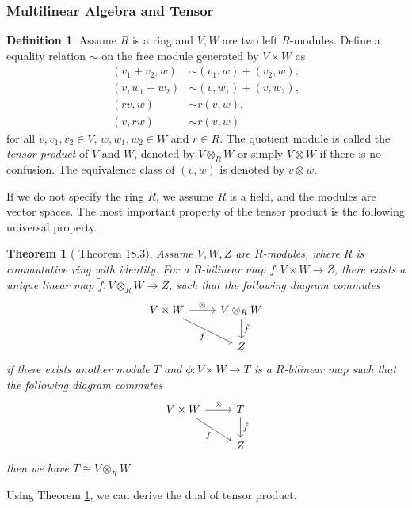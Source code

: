 \documentclass[12pt,a4paper,draft]{article}  %
\newcounter{cite}
\newtheorem{theorem}{Theorem}[section]
\theoremstyle{definition}
\newtheorem{definition}{Definition}[section]
\numberwithin{equation}{section}
\begin{document}
\subsubsection{Multilinear Algebra and Tensor}
\begin{definition}
        Assume $R$ is a ring and $V,W$ are two left $R$-modules. Define a equality relation $\sim$ on the free module generated by $V\times W$ as 
                \[
                \begin{aligned}
                (v_1 + v_2, w) &\sim (v_1,w) + (v_2,w), \\
                (v, w_1 + w_2) &\sim (v,w_1) + (v,w_2), \\
                (r v, w) &\sim r (v,w), \\
                (v, r w) &\sim r (v,w)
                \end{aligned}
                \]
        for all $v,v_1,v_2 \in V$, $w,w_1,w_2 \in W$ and $r \in R$. The quotient module is called the \emph{tensor product} of $V$ and $W$, denoted by $V \otimes_R W$ or simply $V \otimes W$ if there is no confusion. The equivalence class of $(v,w)$ is denoted by $v \otimes w$.
\end{definition}
If we do not specify the ring $R$, we assume $R$ is a field, and the modules are vector spaces. The most important property of the tensor product is the following universal property.
\begin{theorem}[\cite{Tu2017} Theorem 18.3]\label{universal_property_tensor_product}
        Assume $V,W,Z$ are $R$-modules, where $R$ is commutative ring with identity. For a $R$-bilinear map $f:V\times W \to Z$, there exists a unique linear map $\tilde{f}: V\otimes_R W \to Z$, such that the following diagram commutes
    \[
    \begin{tikzcd}
        V \times W \arrow{r}{\otimes} \arrow[swap]{rd}{f} & V \otimes_R W \arrow{d}{\tilde{f}} \\
         & Z
    \end{tikzcd}
    \]
    if there exists another module $T$ and $\phi: V \times W \to T$ is a $R$-bilinear map such that the following diagram commutes
    \[
    \begin{tikzcd}
        V \times W \arrow{r}{\otimes} \arrow[swap]{rd}{f} & T \arrow{d}{\tilde{f}} \\
         & Z
    \end{tikzcd}
    \]
    then we have $T \cong V \otimes_R W$.
\end{theorem}
Using Theorem \ref{universal_property_tensor_product}, we can derive the dual of tensor product.
\end{document}
